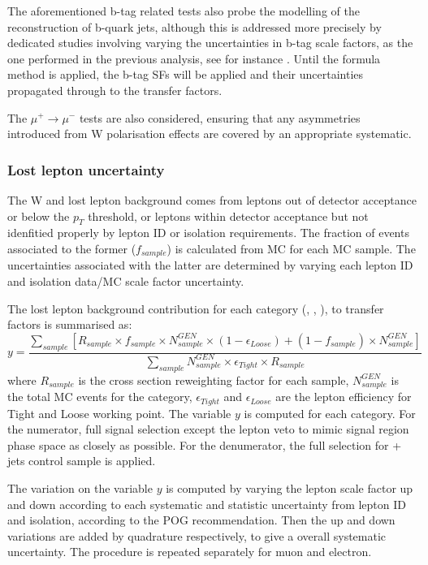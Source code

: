 The aforementioned b-tag related tests also probe the modelling of
the reconstruction of b-quark jets, although this is addressed more
precisely by dedicated studies involving varying the uncertainties in
b-tag scale factors, as the one performed in the previous analysis,
see for instance \cite{CMS_AN_2013-366}. Until the formula method is
applied, the b-tag SFs will be applied and their uncertainties
propagated through to the transfer factors.

The $\mu^{+}\rightarrow\mu^{-}$ tests are also considered, ensuring
that any asymmetries introduced from W polarisation effects are covered by
an appropriate systematic.

\subsubsection{Lost lepton uncertainty}
The W and \ttbar lost lepton background comes from leptons out of detector 
acceptance or below the $p_{T}$ threshold, or leptons within detector
acceptance but not idenfitied properly by lepton ID or isolation
requirements. The fraction of events associated to the former ($f_{sample}$)
is calculated from MC for each MC sample. The uncertainties associated 
with the latter are determined by varying each lepton ID and isolation data/MC
scale factor uncertainty.

The lost lepton background contribution for each category (\njet, \nb, \scalht), to 
transfer factors is summarised as:
\begin{equation}
    \label{eq:lostLepTF}
    y = \frac{\sum_{sample} [ R_{sample} \times f_{sample} \times N^{GEN}_{sample} \times ( 1 - \epsilon_{Loose} ) + ( 1 - f_{sample} ) \times N^{GEN}_{sample} ]}{ \sum_{sample} N^{GEN}_{sample} \times \epsilon_{Tight} \times R_{sample} }
\end{equation}
where $R_{sample}$ is the cross section reweighting factor for each sample, 
$N^{GEN}_{sample}$ is the total MC events for the category, $\epsilon_{Tight}$
and $\epsilon_{Loose}$ are the lepton efficiency for Tight and Loose working 
point. The variable $y$ is computed for each category. For the numerator, full
signal selection except the lepton veto to mimic signal region phase space as
closely as possible. For the denumerator, the full selection for \mj + jets 
control sample is applied.

The variation on the variable $y$ is computed by varying the lepton scale factor
up and down according to each systematic and statistic uncertainty from lepton
ID and isolation, according to the POG recommendation. Then the up and down 
variations are added by quadrature respectively, to give a overall systematic 
uncertainty. The procedure is repeated separately for muon and electron.

